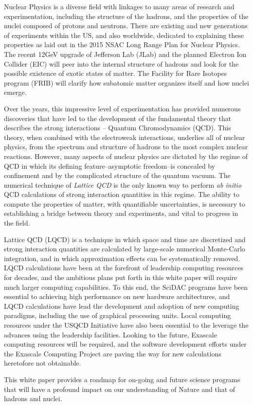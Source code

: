 
Nuclear Physics is a diverse field with linkages to many areas of
research and experimentation, including the structure of the hadrons,
and the properties of the nuclei composed of protons and neutrons.
There are existing and new generations of experiments within the US,
and also worldwide, dedicated to explaining these properties as laid
out in the 2015 NSAC Long Range Plan for Nuclear Physics.  The recent
12GeV upgrade of Jefferson Lab (JLab) and the planned Electron Ion
Collider (EIC) will peer into the internal structure of hadrons and
look for the possible existence of exotic states of matter. The
Facility for Rare Isotopes program (FRIB) will clarify how subatomic
matter organizes itself and how nuclei emerge.

Over the years, this impressive level of experimentation has provided
numerous discoveries that have led to the development of the
fundamental theory that describes the strong interactions -- Quantum
Chromodynamics (QCD). This theory, when combined with the electroweak
interactions, underlies all of nuclear physics, from the spectrum and
structure of hadrons to the most complex nuclear reactions. However,
many aspects of nuclear physics are dictated by the regime of QCD in
which its defining feature--asymptotic freedom--is concealed by
confinement and by the complicated structure of the quantum
vacuum. The numerical technique of {\it Lattice QCD} is the only known
way to perform {\it ab initio} QCD calculations of strong interaction
quantities in this regime. The ability to compute the properties of
matter, with quantifiable uncertainties, is necessary to establishing
a bridge between theory and experiments, and vital to progress in the
field.  

Lattice QCD (LQCD) is a technique in which space and time are
discretized and strong interaction quantities are calculated by
large-scale numerical Monte-Carlo integration, and in which
approximation effects can be systematically removed. LQCD calculations
have been at the forefront of leadership computing resources for
decades, and the ambitious plans put forth in this white paper will
require much larger computing capabilities. To this end, the SciDAC
programs have been essential to achieving high performance on new hardware
architectures, and LQCD calculations have lead the development and
adoption of new computing paradigms, including the use of graphical
processing units. Local computing resources under the USQCD Initiative
have also been essential to the leverage the advances using the
leadership facilities. Looking to the future, Exascale computing resources
will be required, and the software development efforts under the
Exascale Computing Project are paving the way for new calculations
heretofore not obtainable.


This white paper provides a roadmap for on-going and future science
programs that will have a profound impact on our understanding of Nature and
that of hadrons and nuclei.


